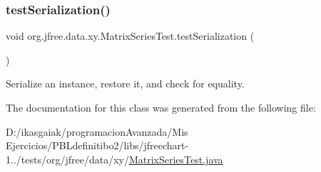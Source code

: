 \subsubsection{\texorpdfstring{test\+Serialization()}{testSerialization()}}
{\footnotesize\ttfamily void org.\+jfree.\+data.\+xy.\+Matrix\+Series\+Test.\+test\+Serialization (\begin{DoxyParamCaption}{ }\end{DoxyParamCaption})}

Serialize an instance, restore it, and check for equality. 

The documentation for this class was generated from the following file\+:\begin{DoxyCompactItemize}
\item 
D\+:/ikasgaiak/programacion\+Avanzada/\+Mis Ejercicios/\+P\+B\+Ldefinitibo2/libs/jfreechart-\/1../tests/org/jfree/data/xy/\mbox{\hyperlink{_matrix_series_test_8java}{Matrix\+Series\+Test.\+java}}\end{DoxyCompactItemize}
